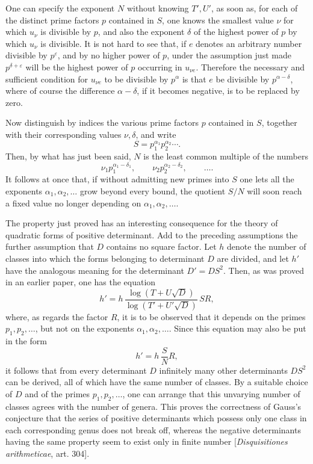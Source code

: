 \documentclass[11pt]{article}
\begin{document}
One can specify the exponent \(N\) without knowing \(T',U'\), as soon as, for each of the distinct prime factors \(p\) contained in \(S\), one knows the smallest value \(\nu\) for which \(u_\nu\) is divisible by \(p\), and also the exponent \(\delta\) of the highest power of \(p\) by which \(u_\nu\) is divisible. It is not hard to see that, if \(e\) denotes an arbitrary number divisible by \(p^\varepsilon\), and by no higher power of \(p\), under the assumption just made \(p^{\delta+\varepsilon}\) will be the highest power of \(p\) occurring in \(u_{\nu e}\). Therefore the necessary and sufficient condition for \(u_{\nu e}\) to be divisible by \(p^\alpha\) is that \(e\) be divisible by \(p^{\alpha-\delta}\), where of course the difference \(\alpha-\delta\), if it becomes negative, is to be replaced by zero.

Now distinguish by indices the various prime factors \(p\) contained in \(S\), together with their corresponding values \(\nu,\delta\), and write
\[
S=p_1^{\alpha_1}p_2^{\alpha_2}\cdots.
\]
Then, by what has just been said, \(N\) is the least common multiple of the numbers
\[
\nu_1p_1^{\alpha_1-\delta_1},\qquad
\nu_2p_2^{\alpha_2-\delta_2},\qquad \ldots .
\]
It follows at once that, if without admitting new primes into \(S\) one lets all the exponents \(\alpha_1,\alpha_2,\ldots\) grow beyond every bound, the quotient \(S/N\) will soon reach a fixed value no longer depending on \(\alpha_1,\alpha_2,\ldots\).

The property just proved has an interesting consequence for the theory of quadratic forms of positive determinant. Add to the preceding assumptions the further assumption that \(D\) contains no square factor. Let \(h\) denote the number of classes into which the forms belonging to determinant \(D\) are divided, and let \(h'\) have the analogous meaning for the determinant \(D'=DS^2\). Then, as was proved in an earlier paper, one has the equation
\[
h'=h\,\frac{\log(T+U\sqrt D)}{\log(T'+U'\sqrt D)}\,SR,
\]
where, as regards the factor \(R\), it is to be observed that it depends on the primes \(p_1,p_2,\ldots\), but not on the exponents \(\alpha_1,\alpha_2,\ldots\). Since this equation may also be put in the form
\[
h'=h\,\frac{S}{N}R,
\]
it follows that from every determinant \(D\) infinitely many other determinants \(DS^2\) can be derived, all of which have the same number of classes. By a suitable choice of \(D\) and of the primes \(p_1,p_2,\ldots\), one can arrange that this unvarying number of classes agrees with the number of genera. This proves the correctness of Gauss's conjecture that the series of positive determinants which possess only one class in each corresponding genus does not break off, whereas the negative determinants having the same property seem to exist only in finite number [\textit{Disquisitiones arithmeticae}, art. 304].
\end{document}
